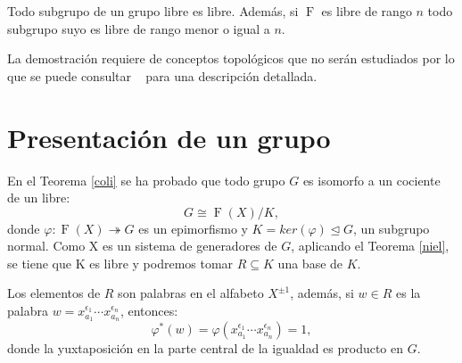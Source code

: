 




\begin{theorem}\label{niel}
Todo subgrupo de un grupo libre es libre.
Además, si $\operatorname{F}$ es libre de rango $n$ todo subgrupo suyo es libre de rango menor o igual a $n$.
\end{theorem}
La demostración requiere de conceptos topológicos que no serán estudiados por lo que se puede consultar ~\cite{Nielsen} para una descripción detallada.










\newpage 
\section{Presentación de un grupo}



En el Teorema \ref{coli} se ha probado que todo grupo $G$ es isomorfo a un cociente de un libre:
\[
    G \cong \operatorname{F}(X)/K ,
\]
donde $\varphi \colon \operatorname{F}(X) \twoheadrightarrow G$ es un epimorfismo y $K=ker(\varphi) \trianglelefteq G$, un subgrupo normal. 
Como X es un sistema de generadores de $G$, aplicando el Teorema \ref{niel}, se tiene que K es libre y podremos tomar $R\subseteq K$ una base de $K$. 

Los elementos de $R$ son palabras en el alfabeto $X^{\pm 1}$, además, si $w\in R$ es  la palabra $w= x_{a_1}^{\epsilon_1} \cdots x_{a_n}^{\epsilon_n}$,  entonces:
\[
    \varphi^*(w)= \varphi(x_{a_1}^{\epsilon_1} \cdots x_{a_n}^{\epsilon_n})=1 ,
\]
donde la yuxtaposición en la parte central de la igualdad es producto en $G$. 


